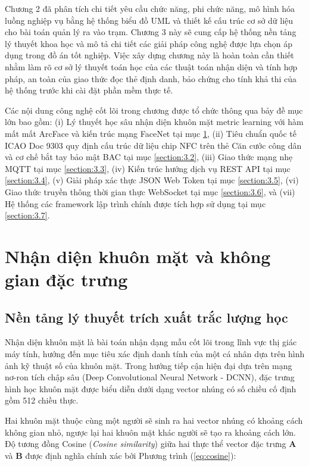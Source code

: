 \documentclass[../DoAn.tex]{subfiles}
\begin{document}
Chương 2 đã phân tích chi tiết yêu cầu chức năng, phi chức năng, mô hình hóa luồng nghiệp vụ bằng hệ thống biểu đồ UML và thiết kế cấu trúc cơ sở dữ liệu cho bài toán quản lý ra vào trạm. Chương 3 này sẽ cung cấp hệ thống nền tảng lý thuyết khoa học và mô tả chi tiết các giải pháp công nghệ được lựa chọn áp dụng trong đồ án tốt nghiệp. Việc xây dựng chương này là hoàn toàn cần thiết nhằm làm rõ cơ sở lý thuyết toán học của các thuật toán nhận diện và tính hợp pháp, an toàn của giao thức đọc thẻ định danh, bảo chứng cho tính khả thi của hệ thống trước khi cài đặt phần mềm thực tế. 

Các nội dung công nghệ cốt lõi trong chương được tổ chức thông qua bảy đề mục lớn bao gồm: (i) Lý thuyết học sâu nhận diện khuôn mặt metric learning với hàm mất mất ArcFace và kiến trúc mạng FaceNet tại mục \ref{section:3.1}, (ii) Tiêu chuẩn quốc tế ICAO Doc 9303 quy định cấu trúc dữ liệu chip NFC trên thẻ Căn cước công dân và cơ chế bắt tay bảo mật BAC tại mục \ref{section:3.2}, (iii) Giao thức mạng nhẹ MQTT tại mục \ref{section:3.3}, (iv) Kiến trúc hướng dịch vụ REST API tại mục \ref{section:3.4}, (v) Giải pháp xác thực JSON Web Token tại mục \ref{section:3.5}, (vi) Giao thức truyền thông thời gian thực WebSocket tại mục \ref{section:3.6}, và (vii) Hệ thống các framework lập trình chính được tích hợp sử dụng tại mục \ref{section:3.7}.

\section{Nhận diện khuôn mặt và không gian đặc trưng}
\label{section:3.1}

\subsection{Nền tảng lý thuyết trích xuất trắc lượng học}

Nhận diện khuôn mặt là bài toán nhận dạng mẫu cốt lõi trong lĩnh vực thị giác máy tính, hướng đến mục tiêu xác định danh tính của một cá nhân dựa trên hình ảnh kỹ thuật số của khuôn mặt. Trong hướng tiếp cận hiện đại dựa trên mạng nơ-ron tích chập sâu (Deep Convolutional Neural Network - DCNN), đặc trưng hình học khuôn mặt được biểu diễn dưới dạng vector nhúng có số chiều cố định gồm 512 chiều thực. 

Hai khuôn mặt thuộc cùng một người sẽ sinh ra hai vector nhúng có khoảng cách không gian nhỏ, ngược lại hai khuôn mặt khác người sẽ tạo ra khoảng cách lớn. Độ tương đồng Cosine (\textit{Cosine similarity}) giữa hai thực thể vector đặc trưng $\mathbf{A}$ và $\mathbf{B}$ được định nghĩa chính xác bởi Phương trình (\ref{eq:cosine}):
\end{document}

